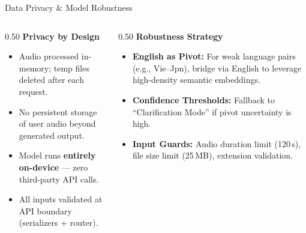 \documentclass{beamer}
\begin{document}
\begin{frame}{Data Privacy \& Model Robustness}
    \begin{columns}[t]
        \begin{column}{0.50\textwidth}
            \textbf{Privacy by Design}
            \begin{itemize}
                \item Audio processed in-memory; temp files deleted after each request.
                \item No persistent storage of user audio beyond generated output.
                \item Model runs \textbf{entirely on-device} --- zero third-party API calls.
                \item All inputs validated at API boundary (serializers + router).
            \end{itemize}
        \end{column}

        \pause

        \begin{column}{0.50\textwidth}
            \textbf{Robustness Strategy}
            \begin{itemize}
                \item \textbf{English as Pivot:} For weak language pairs (e.g., Vie--Jpn), bridge via English to leverage high-density semantic embeddings.
                \item \textbf{Confidence Thresholds:} Fallback to ``Clarification Mode'' if pivot uncertainty is high.
                \item \textbf{Input Guards:} Audio duration limit (120\,s), file size limit (25\,MB), extension validation.
            \end{itemize}
        \end{column}
    \end{columns}
\end{frame}
\end{document}
